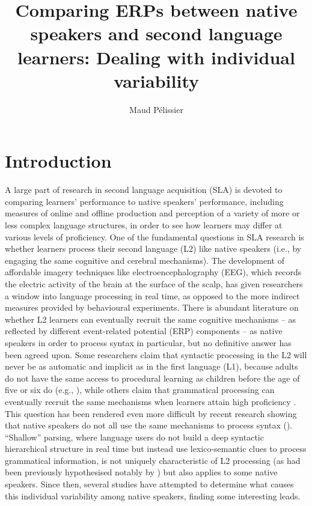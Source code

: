 \documentclass[output=paper,colorlinks,citecolor=brown,modfonts,nonflat]{../langscibook}
\author{Maud Pélissier\affiliation{University of Agder}\orcid{}}
\title{Comparing ERPs between native speakers and second language learners: Dealing with individual variability}
\begin{document}
\maketitle

\section{Introduction}
A large part of research in second language acquisition (SLA) is devoted to comparing learners’ performance to native speakers’ performance, including measures of online and offline production and perception of a variety of more or less complex language structures, in order to see how learners may differ at various levels of proficiency. One of the fundamental questions in SLA research is whether learners process their second language (L2) like native speakers (i.e., by engaging the same cognitive and cerebral mechanisms). The development of affordable imagery techniques like electroencephalography (EEG), which records the electric activity of the brain at the surface of the scalp, has given researchers a window into language processing in real time, as opposed to the more indirect measures provided by behavioural experiments. There is abundant literature on whether L2 learners can eventually recruit the same cognitive mechanisms – as reflected by different event-related potential (ERP) components – as native speakers in order to process syntax in particular, but no definitive answer has been agreed upon. Some researchers claim that syntactic processing in the L2 will never be as automatic and implicit as in the first language (L1), because adults do not have the same access to procedural learning as children before the age of five or six do (e.g., \citealt{Birdsong2006,ClahsenFelser2006,ClahsenFelser2018,Paradis2009}), while others claim that grammatical processing can eventually recruit the same mechanisms when learners attain high proficiency \citep{SteinhauerEtAl2009}. This question has been rendered even more difficult by recent research showing that native speakers do not all use the same mechanisms to process syntax (\citealt{TannerEtAl2013,TannerEtAl2014,TannerHell2014,Tanner2019}). “Shallow” parsing, where language users do not build a deep syntactic hierarchical structure in real time but instead use lexico-semantic clues to process grammatical information, is not uniquely characteristic of L2 processing (as had been previously hypothesised notably by \citealt{ClahsenFelser2006}) but also applies to some native speakers. Since then, several studies have attempted to determine what causes this individual variability among native speakers, finding some interesting leads.
\end{document}

